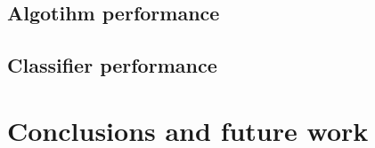 \section{Algotihm performance}
\section{Classifier performance}

\chapter{Conclusions and future work}
